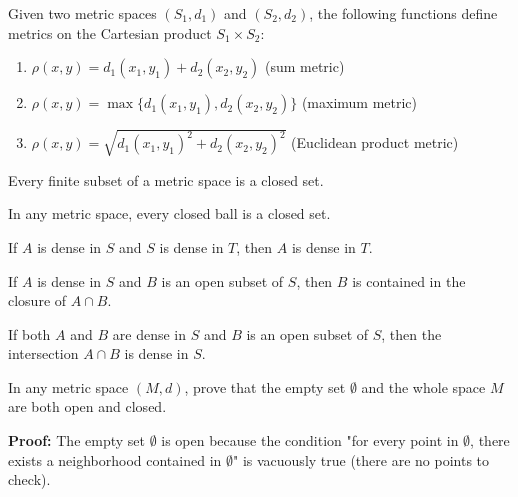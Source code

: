 \begin{theorem}
Given two metric spaces $(S_1,d_1)$ and $(S_2,d_2)$, the following functions define metrics on the Cartesian product $S_1 \times S_2$:
\begin{enumerate}
\item $\rho(x,y) = d_1(x_1,y_1) + d_2(x_2,y_2)$ (sum metric)
\item $\rho(x,y) = \max\{d_1(x_1,y_1), d_2(x_2,y_2)\}$ (maximum metric)
\item $\rho(x,y) = \sqrt{d_1(x_1,y_1)^2 + d_2(x_2,y_2)^2}$ (Euclidean product metric)
\end{enumerate}
\end{theorem}

\begin{theorem}
Every finite subset of a metric space is a closed set.
\end{theorem}

\begin{theorem}
In any metric space, every closed ball is a closed set.
\end{theorem}

\begin{theorem}
If $A$ is dense in $S$ and $S$ is dense in $T$, then $A$ is dense in $T$.
\end{theorem}

\begin{theorem}
If $A$ is dense in $S$ and $B$ is an open subset of $S$, then $B$ is contained in the closure of $A \cap B$.
\end{theorem}

\begin{theorem}
If both $A$ and $B$ are dense in $S$ and $B$ is an open subset of $S$, then the intersection $A \cap B$ is dense in $S$.
\end{theorem}

\begin{problembox}
In any metric space \((M, d)\), prove that the empty set \( \emptyset \) and the whole space \( M \) are both open and closed.
\end{problembox}

\textbf{Proof:} The empty set $\emptyset$ is open because the condition "for every point in $\emptyset$, there exists a neighborhood contained in $\emptyset$" is vacuously true (there are no points to check).

